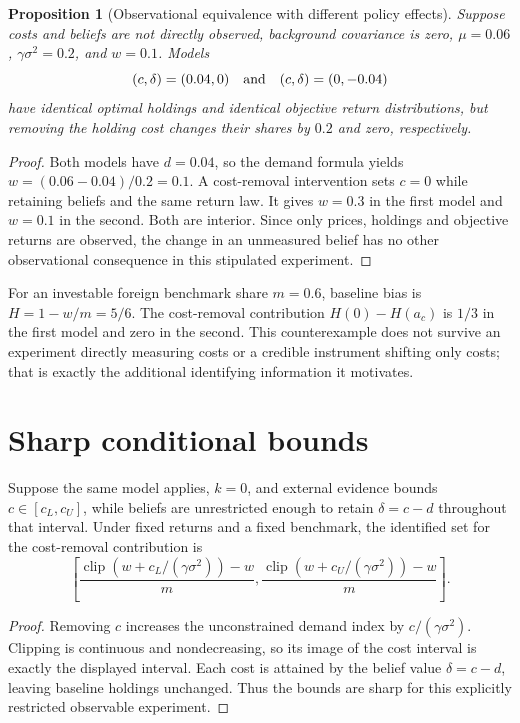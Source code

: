 \documentclass[11pt]{article}
\newtheorem{proposition}{Proposition}
\begin{document}
\begin{proposition}[Observational equivalence with different policy effects]
Suppose costs and beliefs are not directly observed, background covariance is zero, $\mu=0.06$, $\gamma\sigma^2=0.2$, and $w=0.1$. Models
\[
 (c,\delta)=(0.04,0)\quad\hbox{and}\quad(c,\delta)=(0,-0.04)
\]
have identical optimal holdings and identical objective return distributions, but removing the holding cost changes their shares by $0.2$ and zero, respectively.
\end{proposition}
\begin{proof}
Both models have $d=0.04$, so the demand formula yields $w=(0.06-0.04)/0.2=0.1$. A cost-removal intervention sets $c=0$ while retaining beliefs and the same return law. It gives $w=0.3$ in the first model and $w=0.1$ in the second. Both are interior. Since only prices, holdings and objective returns are observed, the change in an unmeasured belief has no other observational consequence in this stipulated experiment.
\end{proof}

For an investable foreign benchmark share $m=0.6$, baseline bias is $H=1-w/m=5/6$. The cost-removal contribution $H(0)-H(a_c)$ is $1/3$ in the first model and zero in the second. This counterexample does not survive an experiment directly measuring costs or a credible instrument shifting only costs; that is exactly the additional identifying information it motivates.

\section*{Sharp conditional bounds}
Suppose the same model applies, $k=0$, and external evidence bounds $c\in[c_L,c_U]$, while beliefs are unrestricted enough to retain $\delta=c-d$ throughout that interval. Under fixed returns and a fixed benchmark, the identified set for the cost-removal contribution is
\[
 \left[
 \frac{\operatorname{clip}(w+c_L/(\gamma\sigma^2))-w}{m},
 \frac{\operatorname{clip}(w+c_U/(\gamma\sigma^2))-w}{m}
 \right].
\]
\begin{proof}
Removing $c$ increases the unconstrained demand index by $c/(\gamma\sigma^2)$. Clipping is continuous and nondecreasing, so its image of the cost interval is exactly the displayed interval. Each cost is attained by the belief value $\delta=c-d$, leaving baseline holdings unchanged. Thus the bounds are sharp for this explicitly restricted observable experiment.
\end{proof}
\end{document}
